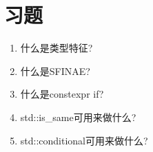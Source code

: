 \section{习题}
\begin{enumerate}
\item
什么是类型特征?

\item
什么是SFINAE?

\item
什么是constexpr if?

\item
std::is\_same可用来做什么?

\item
std::conditional可用来做什么?
\end{enumerate}